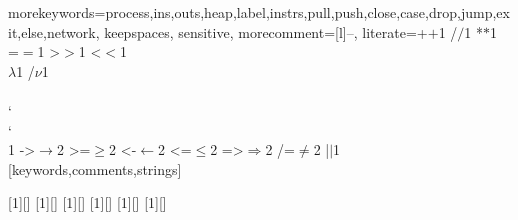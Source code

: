 %
  {morekeywords={process,ins,outs,heap,label,instrs,pull,push,close,case,drop,jump,exit,else,network},%
   keepspaces,%
   sensitive,%
   morecomment=[l]--,%
   literate={+}{{$+$}}1 {/}{{$/$}}1 {*}{{$*$}}1 {=}{{$=$}}1
            {>}{{$>$}}1 {<}{{$<$}}1 {\\}{{$\lambda$}}1 {/}{{$\nu$}}1
            {\\\\}{{\char`\\\char`\\}}1
            {->}{{$\rightarrow$}}2 {>=}{{$\geq$}}2 {<-}{{$\leftarrow$}}2
            {<=}{{$\leq$}}2 {=>}{{$\Rightarrow$}}2 
            {/=}{{$\ne$}}2
            {|}{{$\mid$}}1
  }[keywords,comments,strings]%



[1][]{\lstset{language=icicle,#1}}{}
[1][]{\lstset{language=icicle-core,#1}}{}
[1][]{\lstset{language=Haskell,#1}}{}
[1][]{\lstset{language=sql,#1}}{}
[1][]{\lstset{language=coq,#1}}{}
[1][]{\lstset{language=process,#1}}{}

% 
% 

\newcommand\Hs{\lstinline}

\def\lstiproc{\lstinline[language=process]}
